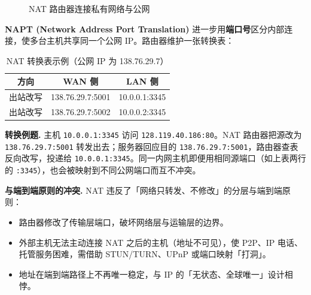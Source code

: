 \begin{figure}[H]
\centering
{}
\caption{NAT 路由器连接私有网络与公网}
\label{fig:nat}
\end{figure}

\textbf{NAPT (Network Address Port Translation)} 进一步用\textbf{端口号}区分内部连接，使多台主机共享同一个公网 IP。路由器维护一张转换表：

\begin{table}[H]
\centering
\caption{NAT 转换表示例（公网 IP 为 138.76.29.7）}
\begin{tabulary}{\textwidth}{CCC}
\toprule
方向 & WAN 侧 & LAN 侧 \\
\midrule
出站改写 & 138.76.29.7:5001 & 10.0.0.1:3345 \\
出站改写 & 138.76.29.7:5002 & 10.0.0.2:3345 \\
\bottomrule
\end{tabulary}
\end{table}

\noindent\textbf{转换例题.} 主机 \texttt{10.0.0.1:3345} 访问 \texttt{128.119.40.186:80}。NAT 路由器把源改为 \texttt{138.76.29.7:5001} 转发出去；服务器回应目的 \texttt{138.76.29.7:5001}，路由器查表反向改写，投递给 \texttt{10.0.0.1:3345}。同一内网主机即便用相同源端口（如上表两行的 \texttt{:3345}），也会被映射到不同公网端口而互不冲突。

\textbf{与端到端原则的冲突.} NAT 违反了「网络只转发、不修改」的分层与端到端原则：

\begin{itemize}
    \item 路由器修改了传输层端口，破坏网络层与运输层的边界。
    \item 外部主机无法主动连接 NAT 之后的主机（地址不可见），使 P2P、IP 电话、托管服务困难，需借助 STUN/TURN、UPnP 或端口映射「打洞」。
    \item 地址在端到端路径上不再唯一稳定，与 IP 的「无状态、全球唯一」设计相悖。
\end{itemize}

